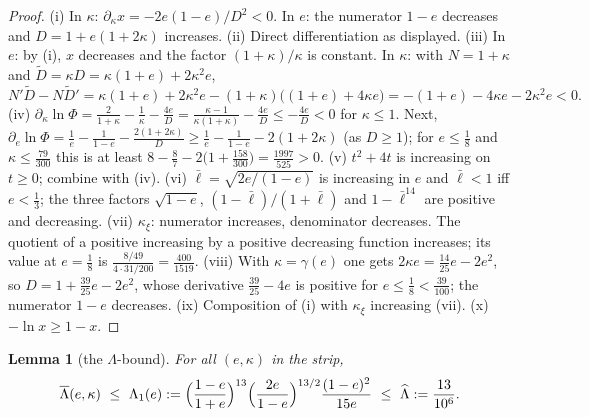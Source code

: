 \documentclass[11pt]{article}
\newtheorem{lemma}[theorem]{Lemma}
\theoremstyle{remark}
\theoremstyle{plain}
\theoremstyle{plain}
\newcommand{\kxi}{\kappa_\xi}
\newcommand{\lbar}{\bar\ell}
\begin{document}
\begin{proof}
(i) In $\kappa$: $\partial_\kappa x=-2e(1-e)/D^2<0$.  In $e$: the numerator
$1-e$ decreases and $D=1+e(1+2\kappa)$ increases.
(ii) Direct differentiation as displayed.
(iii) In $e$: by (i), $x$ decreases and the factor $(1+\kappa)/\kappa$ is
constant.  In $\kappa$: with $N=1+\kappa$ and $\tilde D=\kappa D
=\kappa(1+e)+2\kappa^2e$,
\[
        N'\tilde D-N\tilde D'
        =\kappa(1+e)+2\kappa^2e-(1+\kappa)\bigl((1+e)+4\kappa e\bigr)
        =-(1+e)-4\kappa e-2\kappa^2e<0 .
\]
(iv) $\partial_\kappa\ln\Phi=\frac2{1+\kappa}-\frac1\kappa-\frac{4e}D
=\frac{\kappa-1}{\kappa(1+\kappa)}-\frac{4e}D\le-\frac{4e}D<0$ for
$\kappa\le1$.  Next,
$\partial_e\ln\Phi=\frac1e-\frac1{1-e}-\frac{2(1+2\kappa)}D
\ge\frac1e-\frac1{1-e}-2(1+2\kappa)$ (as $D\ge1$); for $e\le\tfrac18$ and
$\kappa\le\tfrac{79}{300}$ this is at least
$8-\tfrac87-2\bigl(1+\tfrac{158}{300}\bigr)=\tfrac{1997}{525}>0$.
(v) $t^2+4t$ is increasing on $t\ge0$; combine with (iv).
(vi) $\lbar=\sqrt{2e/(1-e)}$ is increasing in $e$ and $\lbar<1$ iff
$e<\tfrac13$; the three factors $\sqrt{1-e}$, $(1-\lbar)/(1+\lbar)$ and
$1-\lbar^{14}$ are positive and decreasing.
(vii) $\kxi$: numerator increases, denominator decreases.  The quotient of
a positive increasing by a positive decreasing function increases; its
value at $e=\tfrac18$ is $\frac{8/49}{4\cdot31/200}=\frac{400}{1519}$.
(viii) With $\kappa=\gamma(e)$ one gets $2\kappa e=\tfrac{14}{25}e-2e^2$,
so $D=1+\tfrac{39}{25}e-2e^2$, whose derivative $\tfrac{39}{25}-4e$ is
positive for $e\le\tfrac18<\tfrac{39}{100}$; the numerator $1-e$ decreases.
(ix) Composition of (i) with $\kxi$ increasing (vii).
(x) $-\ln x\ge1-x$.
\end{proof}

\begin{lemma}[the $\Lambda$-bound]\label{lem:zb-lambda}
For all $(e,\kappa)$ in the strip,
\[
        \overline\Lambda(e,\kappa)\ \le\
        \Lambda_1(e):=\Bigl(\frac{1-e}{1+e}\Bigr)^{13}
        \Bigl(\frac{2e}{1-e}\Bigr)^{13/2}\frac{(1-e)^2}{15e}
        \ \le\ \widehat\Lambda:=\frac{13}{10^6}.
\]
\end{lemma}
\end{document}
